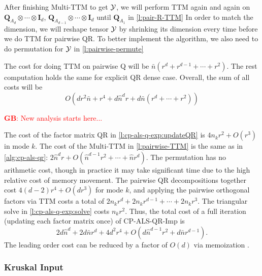 \documentclass{article}
\newcommand{\mat}[1]{\mathbf{#1}}
\newcommand{\T}[2][]{#1{\mathbf{\cal{#2}}}} 						%
\newcommand{\GB}[1]{\textcolor{red}{\textbf{GB}: #1}}
\begin{document}
After finishing Multi-TTM to get $\T[]{Y}$, we will perform TTM again and again on $\mat{Q}_{A_d} \otimes \cdots \otimes \mat{I}_d$, $\mat{Q}_{A_{d-1}} \otimes \cdots \otimes \mat{I}_d$ until $\mat{Q}_{A_1}$ in \cref{l:pair-R-TTM}
In order to match the dimension, we will reshape tensor $\T[]{Y}$ by shrinking its dimension every time before we do TTM for pairwise QR.
To better implement the algorithm, we also need to do permutation for $\T[]{Y}$ in \cref{l:pairwise-permute}

The cost for doing TTM on pairwise Q will be $\bar{n}(r^d + r^{d-1}+\cdots + r^2)$. 
The rest computation holds the same for explicit QR dense case.
Overall, the sum of all costs will be 
$$O(dr^2\bar n + r^4 + d\hat n^d r + d\bar n(r^d + \cdots + r^2))$$

\GB{New analysis starts here...}

The cost of the factor matrix QR in \cref{l:cp-als-q-exp:updateQR} is $4n_kr^2+O(r^3)$ in mode $k$.
The cost of the Multi-TTM in \cref{l:pairwise-TTM} is the same as in \cref{alg:cp-als-qr}: $2\hat{n}^dr+O(\hat{n}^{d-1}r^2 + \cdots + \hat{n}r^d)$.
The permutation has no arithmetic cost, though in practice it may take significant time due to the high relative cost of memory movement.
The pairwise QR decompositions together cost $4(d-2)r^4 + O(dr^3)$ for mode $k$, and applying the pairwise orthogonal factors via TTM costs a total of $2n_kr^d+2n_kr^{d-1}+\cdots+2n_kr^3$.
The triangular solve in \cref{l:cp-als-q-exp:solve} costs $n_kr^2$.
Thus, the total cost of a full iteration (updating each factor matrix once) of CP-ALS-QR-Imp is
$$ 2d\hat{n}^d + 2d\bar{n}r^d + 4d^2r^4 + O(d\hat{n}^{d-1}r^2 + d\bar{n}r^{d-1}). $$
The leading order cost can be reduced by a factor of $O(d)$ via memoization \cite{KR19}.

\subsubsection{Kruskal Input}
\end{document}
